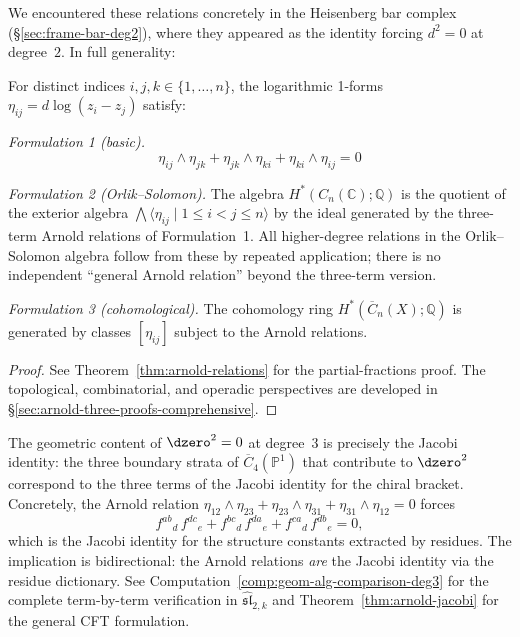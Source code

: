 \begin{theorem}\label{thm:arnold-three}
We encountered these relations concretely in the Heisenberg bar complex (\S\ref{sec:frame-bar-deg2}), where they appeared as the identity forcing $d^2 = 0$ at degree~$2$.  In full generality:

For distinct indices $i, j, k \in \{1, \ldots, n\}$, the logarithmic 1-forms $\eta_{ij} = d\log(z_i - z_j)$ satisfy:

\emph{Formulation 1 (basic).}
\[\eta_{ij} \wedge \eta_{jk} + \eta_{jk} \wedge \eta_{ki} + \eta_{ki} \wedge \eta_{ij} = 0\]

\emph{Formulation 2 (Orlik--Solomon).}
The algebra $H^*(C_n(\mathbb{C}); \mathbb{Q})$ is the quotient of the exterior algebra $\bigwedge\langle \eta_{ij} \mid 1 \le i < j \le n \rangle$ by the ideal generated by the three-term Arnold relations of Formulation~1.  All higher-degree relations in the Orlik--Solomon algebra follow from these by repeated application; there is no independent ``general Arnold relation'' beyond the three-term version.

\emph{Formulation 3 (cohomological).}
The cohomology ring $H^*(\overline{C}_n(X); \mathbb{Q})$ is generated by classes $[\eta_{ij}]$ subject to the Arnold relations.
\end{theorem}

\begin{proof}
See Theorem~\ref{thm:arnold-relations} for the partial-fractions proof.
The topological, combinatorial, and operadic perspectives are developed in \S\ref{sec:arnold-three-proofs-comprehensive}.
\end{proof}

\begin{remark}[Arnold relations = Jacobi identity]\label{rem:arnold-jacobi-geometric}
The geometric content of $\dzero^2 = 0$ at degree~$3$ is precisely the Jacobi identity: the three boundary strata of $\overline{C}_4(\mathbb{P}^1)$ that contribute to $\dzero^2$ correspond to the three terms of the Jacobi identity for the chiral bracket.  Concretely, the Arnold relation $\eta_{12} \wedge \eta_{23} + \eta_{23} \wedge \eta_{31} + \eta_{31} \wedge \eta_{12} = 0$ forces
\[
{f^{ab}}_d\,{f^{dc}}_e + {f^{bc}}_d\,{f^{da}}_e + {f^{ca}}_d\,{f^{db}}_e = 0,
\]
which is the Jacobi identity for the structure constants extracted by residues.  The implication is bidirectional: the Arnold relations \emph{are} the Jacobi identity via the residue dictionary.  See Computation~\ref{comp:geom-alg-comparison-deg3} for the complete term-by-term verification in $\widehat{\mathfrak{sl}}_{2,k}$ and Theorem~\ref{thm:arnold-jacobi} for the general CFT formulation.
\end{remark}

